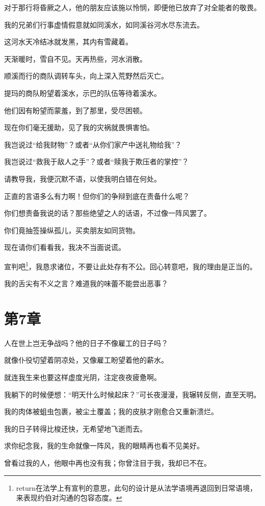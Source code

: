 \documentclass[12pt,oneside]{book}
\begin{document}
对于那行将昏厥之人，他的朋友应该施以怜悯，即便他已放弃了对全能者的敬畏。

我的兄弟们行事虚情假意就如同溪水，如同溪谷河水尽东流去。

这河水天冷结冰就发黑，其内有雪藏着。

天渐暖时，雪自不见。天再热些，河水消散。

顺溪而行的商队调转车头，向上深入荒野然后灭亡。

提玛的商队盼望着溪水，示巴的队伍等待着溪水。

他们因有盼望而蒙羞，到了那里，受尽困顿。

现在你们毫无援助，见了我的灾祸就畏惧害怕。

我岂说过“给我财物”？或者“从你们家产中送礼物给我”？

我岂说过“救我于敌人之手”？或者“赎我于欺压者的掌控”？

请教导我，我便沉默不语，以使我明白错在何处。

正直的言语多么有力啊！但你们的争辩到底在责备什么呢？

你们想责备我说的话？那些绝望之人的话语，不过像一阵风罢了。

你们竟抽签操纵孤儿，买卖朋友如同货物。

现在请你们看看我，我决不当面说谎。

宣判吧\footnote{return在法学上有宣判的意思，此句的设计是从法学语境再退回到日常语境，来表现约伯对沟通的包容态度。}，我恳求诸位，不要让此处存有不公。回心转意吧，我的理由是正当的。

我的舌尖有不义之言？难道我的味蕾不能尝出恶事？



\chapter{第7章}
人在世上岂无争战吗？他的日子不像雇工的日子吗？

就像仆役切望着阴凉处，又像雇工盼望着他的薪水。

就连我生来也要这样虚度光阴，注定夜夜疲惫啊。

我躺下的时候便想：“明天什么时候起床？”可长夜漫漫，我辗转反侧，直至天明。

我的肉体被蛆虫包裹，被尘土覆盖；我的皮肤才刚愈合又重新溃烂。

我的日子转得比梭还快，无希望地飞逝而去。

求你纪念我，我的生命就像一阵风，我的眼睛再也看不见美好。

曾看过我的人，他眼中再也没有我；你曾注目于我，我却已不在。
\end{document}
